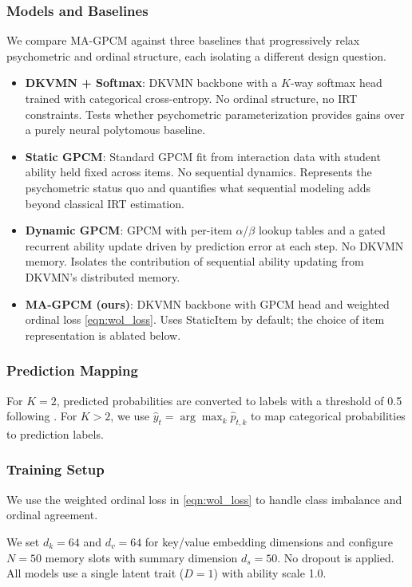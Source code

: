\documentclass[pdflatex,sn-apa]{sn-jnl}
\begin{document}
\subsubsection{Models and Baselines}
We compare MA-GPCM against three baselines that progressively relax psychometric and ordinal structure, each isolating a different design question.
\begin{itemize}
    \item \textbf{DKVMN + Softmax}: DKVMN backbone with a $K$-way softmax head trained with categorical cross-entropy. No ordinal structure, no IRT constraints. Tests whether psychometric parameterization provides gains over a purely neural polytomous baseline.
    \item \textbf{Static GPCM}: Standard GPCM fit from interaction data with student ability held fixed across items. No sequential dynamics. Represents the psychometric status quo and quantifies what sequential modeling adds beyond classical IRT estimation.
    \item \textbf{Dynamic GPCM}: GPCM with per-item $\alpha$/$\beta$ lookup tables and a gated recurrent ability update driven by prediction error at each step. No DKVMN memory. Isolates the contribution of sequential ability updating from DKVMN's distributed memory.
    \item \textbf{MA-GPCM (ours)}: DKVMN backbone with GPCM head and weighted ordinal loss \eqref{eqn:wol_loss}. Uses StaticItem by default; the choice of item representation is ablated below.
\end{itemize}

\subsubsection{Prediction Mapping}
For $K=2$, predicted probabilities are converted to labels with a threshold of 0.5 following \citet{zhang_dynamic_2017}. For $K>2$, we use $\hat{y}_t=\arg\max_k \hat{p}_{t,k}$ to map categorical probabilities to prediction labels.

\subsubsection{Training Setup}
We use the weighted ordinal loss in \eqref{eqn:wol_loss} to handle class imbalance and ordinal agreement.

We set $d_k=64$ and $d_v=64$ for key/value embedding dimensions and configure $N=50$ memory slots with summary dimension $d_s=50$. No dropout is applied. All models use a single latent trait ($D=1$) with ability scale 1.0.
\end{document}
